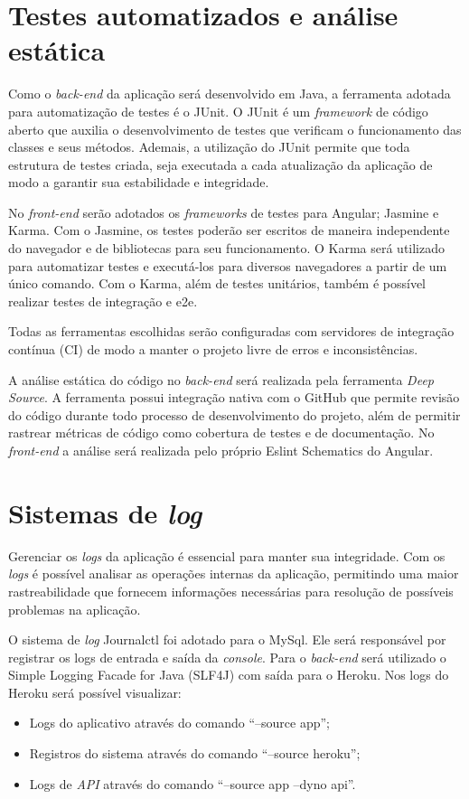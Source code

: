\documentclass[
    12pt,               %
    openright,          %
    oneside,
    a4paper,            %
    paginasA3,  %
    MODELO,             %
    TODO,               %
    english,            %
    brazil              %
    ]{ifsp-spo-inf-ctds} %
\begin{document}
\section{Testes automatizados e análise estática}

Como o \textit{back-end} da aplicação será desenvolvido em Java, a ferramenta adotada para automatização de testes é o JUnit. O JUnit é um \textit{framework} de código aberto que auxilia o desenvolvimento de testes que verificam o funcionamento das classes e seus métodos. Ademais, a utilização do JUnit permite que toda estrutura de testes criada, seja executada a cada atualização da aplicação  de modo a garantir sua estabilidade e integridade.

No \textit{front-end} serão adotados os \textit{frameworks} de testes para Angular; Jasmine e Karma. Com o Jasmine, os testes poderão ser escritos de maneira independente do navegador e de bibliotecas para seu funcionamento. O Karma será utilizado para automatizar testes e executá-los para diversos navegadores a partir de um único comando. Com o Karma, além de testes unitários, também é possível realizar testes de integração e e2e.

Todas as ferramentas escolhidas serão configuradas com servidores de integração contínua (CI) de modo a manter o projeto livre de erros e inconsistências.

A análise estática do código no \textit{back-end} será realizada pela ferramenta \textit{Deep Source}. A ferramenta possui integração nativa com o GitHub que permite revisão do código durante todo processo de desenvolvimento do projeto, além de permitir rastrear métricas de código como cobertura de testes e de documentação. No \textit{front-end} a análise será realizada pelo próprio Eslint Schematics do Angular.

\section{Sistemas de \textit{log}}
Gerenciar os \textit{logs} da aplicação é essencial para manter sua integridade. Com os \textit{logs} é possível analisar as operações internas da aplicação, permitindo uma maior rastreabilidade que fornecem informações necessárias para resolução de possíveis problemas na aplicação.

O sistema de \textit{log} Journalctl foi adotado para o MySql. Ele será responsável por registrar os logs de entrada e saída da \textit{console}. 
Para o \textit{back-end} será utilizado o Simple Logging Facade for Java (SLF4J) com saída para o Heroku.  Nos logs do Heroku será possível visualizar: 
\begin{itemize}
\item Logs do aplicativo através do comando “--source app”;
\item Registros do sistema através do comando “--source heroku”;
\item Logs de \textit{API} através do comando “--source app --dyno api”.
\end{itemize}
\end{document}
